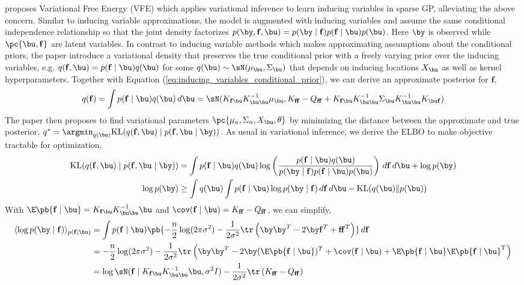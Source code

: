 \documentclass[11pt]{article}
\renewcommand\bf{\ensuremath{\mathbf{f}}}
\begin{document}
\cite{titsiasVariationalLearningInducing2009} proposes Variational Free Energy (VFE) which applies variational inference to learn inducing variables in sparse GP, alleviating the above concern. Similar to inducing variable approximations, the model is augmented with inducing variables and assume the same conditional independence relationship so that the joint density factorizes $p(\by,\bf,\bu) = p(\by\mid\bf) p(\bf\mid \bu) p(\bu)$. Here $\by$ is observed while $\pc{\bu,\bf}$ are latent variables. In contrast to inducing variable methods which makes approximating assumptions about the conditional priors, the paper introduce a variational density that preserves the true conditional prior with a freely varying prior over the inducing variables, e.g. $q(\bf,\bu) = p(\bf\mid\bu)q(\bu)$ for some $q(\bu)\sim \sN(\mu_{\bu},\Sigma_{\bu})$ that depends on inducing locations $X_{\bu}$ as well as kernel hyperparameters. Together with Equation (\ref{eq:inducing_variables_conditional_prior}), we can derive an approximate posterior for $\bf$,
\begin{align}
    q(\bf)
        = \int p(\bf\mid\bu)q(\bu) \, d\bu
        = \sN( K_{\bf\bu} K_{\bu\bu}^{-1} \mu_{\bu},
               K_{\bf\bf} - Q_{\bf\bf} +  K_{\bf\bu} K_{\bu\bu}^{-1} \Sigma_{\bu} K_{\bu\bu}^{-1} K_{\bu\bf} )
    \label{eq:inducing_variables_approximate_prior_f}
\end{align}
The paper then proposes to find variational parameters $\pc{\mu_n,\Sigma_n,X_{\bu},\theta}$ by minimizing the distance between the approximate and true posterior, $q^* = \argmin_{q(\bu)} \text{KL}(q(\bf,\bu)\mid p(\bf,\bu\mid \by))$. As usual in variational inference, we derive the ELBO to make objective tractable for optimization,
\begin{align}
    \text{KL}(q(\bf,\bu)\mid p(\bf,\bu\mid \by))
        &= \int p(\bf\mid\bu) q(\bu) \log \left( \frac{p(\bf\mid\bu)q(\bu)}{p(\by\mid\bf) p(\bf\mid\bu) p(\bu)}  \right) \, d\bf\, d\bu + \log p(\by) \\
    \log p(\by)
        &\geq \int q(\bu) \int p(\bf\mid\bu) \log p(\by\mid \bf) \, d\bf \, d\bu - \text{KL}(q(\bu) \Vert p(\bu))
    \label{eq:sparse_gp_vfe_elbo}
\end{align}
With $\E\pb{\bf\mid\bu} = K_{\bf\bu} K_{\bu\bu}^{-1}\bu$ and $\cov(\bf\mid\bu) = K_{\bf\bf} - Q_{\bf\bf}$, we can simplify,
\begin{align}
    \langle \log p(\by\mid\bf) \rangle_{p(\bf\mid\bu)}
        &= \int p(\bf\mid\bu) \pb{
            -\frac{n}{2} \log(2\pi \sigma^2) - \frac{1}{2\sigma^2} \tr\left( \by\by^T - 2\by\bf^T + \bf\bf^T \right)
        }\, d\bf \\
        &=  -\frac{n}{2} \log(2\pi \sigma^2) - \frac{1}{2\sigma^2} \tr\left( \by\by^T - 2\by (\E\pb{\bf\mid\bu})^T + \cov(\bf\mid\bu) + \E\pb{\bf\mid\bu} \E\pb{\bf\mid\bu}^T \right) \\
        &=  \log \sN(\bf \mid K_{\bf\bu}K_{\bu\bu}^{-1}\bu, \sigma^2I) - \frac{1}{2\sigma^2} \tr\left( K_{\bf\bf} - Q_{\bf\bf} \right)
\end{align}
\end{document}
